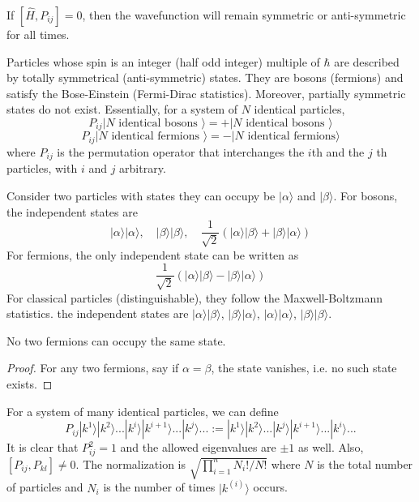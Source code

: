 \documentclass[a4paper]{article}
\begin{document}
\begin{cor}
If $[\hat{H},P_{ij}]=0$, then the wavefunction will remain symmetric or anti-symmetric for all times.
\end{cor}
\begin{defi}
Particles whose spin is an integer (half odd integer) multiple of $\hbar$ are described by totally symmetrical (anti-symmetric) states. They are bosons (fermions) and satisfy the Bose-Einstein (Fermi-Dirac statistics). Moreover, partially symmetric states do not exist. Essentially, for a system of $N$ identical particles,
$$P_{ij}|N\text{ identical bosons }\rangle=+|N\text{ identical bosons }\rangle$$
$$P_{ij}|N\text{ identical fermions }\rangle=-|N\text{ identical fermions}\rangle$$
where $P_{ij}$ is the permutation operator that interchanges the $i$th and the $j$ th particles, with $i$ and $j$ arbitrary.
\end{defi}
\begin{eg}
Consider two particles with states they can occupy be $|\alpha\rangle$ and $|\beta\rangle$. For bosons, the independent states are
$$|\alpha\rangle|\alpha\rangle,\quad|\beta\rangle|\beta\rangle,\quad\frac{1}{\sqrt{2}}(|\alpha\rangle|\beta\rangle+|\beta\rangle|\alpha\rangle)$$
For fermions, the only independent state can be written as
$$\frac{1}{\sqrt{2}}(|\alpha\rangle|\beta\rangle-|\beta\rangle|\alpha\rangle)$$
For classical particles (distinguishable), they follow the Maxwell-Boltzmann statistics. the independent states are $|\alpha\rangle|\beta\rangle$, $|\beta\rangle|\alpha\rangle$, $|\alpha\rangle|\alpha\rangle$, $|\beta\rangle|\beta\rangle$.
\end{eg}
\begin{thm}
No two fermions can occupy the same state.
\end{thm}
\begin{proof}
For any two fermions, say if $\alpha=\beta$, the state vanishes, i.e. no such state exists.
\end{proof}
\begin{defi}
For a system of many identical particles, we can define
$$P_{ij}|k^1\rangle|k^2\rangle...|k^i\rangle|k^{i+1}\rangle...|k^j\rangle...:=|k^1\rangle|k^2\rangle...|k^j\rangle|k^{i+1}\rangle...|k^i\rangle...$$
It is clear that $P_{ij}^2=1$ and the allowed eigenvalues are $\pm 1$ as well. Also, $[P_{ij},P_{kl}]\neq 0$. The normalization is $\sqrt{\prod_{i=1}^nN_i!/N!}$ where $N$ is the total number of particles and $N_i$ is the number of times $|k^{(i)}\rangle$ occurs.
\end{defi}
\end{document}
